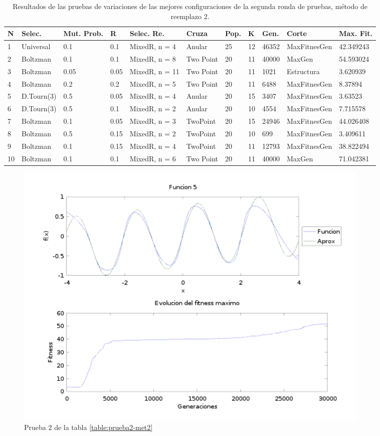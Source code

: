 \documentclass[11pt,a4paper]{article}
\begin{document}
\begin{table}[h]
\centering
\hspace*{-2.55cm}
\begin{tabular}{|l|l|l|l|l|l|l|l|l|l|l|}
\hline
N & Selec. & Mut. Prob. & R & Selec. Re. & Cruza & Pop. & K & Gen. & Corte & Max. Fit. \\ \hline
1 & Universal & 0.1 & 0.1 & MixedR, n = 4 & Anular & 25 & 12 & 46352 & MaxFitnesGen & 42.349243 \\ \hline
2 & Boltzman & 0.1 & 0.1 & MixedR, n = 8 & Two Point & 20 & 11 & 40000 & MaxGen & 54.593024 \\ \hline
3 & Boltzman & 0.05 & 0.05 & MixedR, n = 11 & Two Point & 20 & 11 & 1021 & Estructura & 3.620939 \\ \hline
4 & Boltzman & 0.2 & 0.2 & MixedR, n = 5 & Two Point & 20 & 11 & 6488 & MaxFitnesGen & 8.37894 \\ \hline
5 & D.Tourn(3) & 0.5 & 0.05 & MixedR, n = 4 & Anular & 20 & 15 & 3407 & MaxFitnesGen & 3.63523 \\ \hline
6 & D.Tourn(3) & 0.5 & 0.1 & MixedR, n = 2 & Anular & 20 & 10 & 4554 & MaxFitnesGen & 7.715578 \\ \hline
7 & Boltzman & 0.1 & 0.05 & MixedR, n = 3 & TwoPoint & 20 & 15 & 24946 & MaxFitnesGen & 44.026408 \\ \hline
8 & Boltzman & 0.5 & 0.15 & MixedR, n = 2 & TwoPoint & 20 & 10 & 699 & MaxFitnesGen & 3.409611 \\ \hline
9 & Boltzman & 0.1 & 0.15 & MixedR, n = 4 & TwoPoint & 20 & 11 & 12793 & MaxFitnesGen & 38.822494 \\ \hline
10 & Boltzman & 0.1 & 0.1 & MixedR, n = 6 & Two Point & 20 & 11 & 40000 & MaxGen & 71.042381 \\ \hline
\end{tabular}
\caption{Resultados de las pruebas de variaciones de las mejores configuraciones de la segunda ronda de pruebas, método de reemplazo 2.}
\label{table:pruebaF1}
\end{table}

\begin{figure}[h]
\centering
\includegraphics[width=0.85\textwidth]{img/56.png}
\caption{\label{fig:56} Prueba 2 de la tabla \ref{table:prueba2-met2}}
\end{figure}
\end{document}
